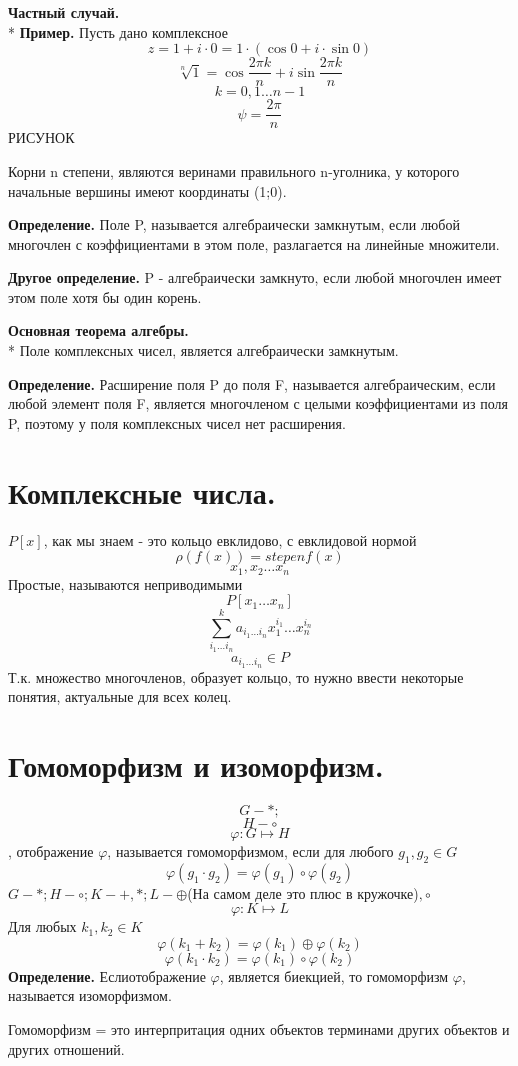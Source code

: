 \documentclass{article}
\begin{document}
{\bf Частный случай.}\\*
{\bf Пример.} Пусть дано комплексное $$z=1+i\cdot 0=1\cdot(\cos0+i\cdot\sin0)$$
$$\sqrt[n]{1}=\cos\frac{2\pi k}{n}+i\sin\frac{2\pi k}{n}$$
$$k=0,1\ldots n-1$$
$$\psi=\frac{2\pi}{n}$$
РИСУНОК

Корни n степени, являются веринами правильного n-уголника, у которого начальные вершины имеют координаты (1;0).

{\bf Определение.} Поле P, называется алгебраически замкнутым, если любой многочлен с коэффициентами в этом поле, разлагается на линейные множители.

{\bf Другое определение.} P - алгебраически замкнуто, если любой многочлен имеет  этом поле хотя бы один корень.

{\bf Основная теорема алгебры.}\\*
Поле комплексных чисел, является алгебраически замкнутым.

{\bf Определение.} Расширение поля P до поля F, называется алгебраическим, если любой элемент поля F, является многочленом с целыми коэффициентами из поля P, поэтому у поля комплексных чисел нет расширения.
\section*{Комплексные числа.} 
$P[x]$, как мы знаем - это кольцо евклидово, с евклидовой нормой $$\rho(f(x))=stepenf(x)$$
$$x_1,x_2\ldots x_n$$
Простые, называются неприводимыми $$P[x_1\ldots x_n]$$
$$\sum_{i_1\ldots i_n}^k a_{i_1\ldots i_n}x^{i_1}_1\ldots x^{i_n}_n$$
$$a_{i_1\ldots i_n}\in P$$
Т.к. множество многочленов, образует кольцо, то нужно ввести некоторые понятия, актуальные для всех колец.

\section*{Гомоморфизм и изоморфизм.} $$G - *;$$ $$H - \circ$$
$$\varphi:G\mapsto H$$, отображение $\varphi$, называется гомоморфизмом, если для любого $g_1,g_2\in G$ $$\varphi(g_1\cdot g_2)=\varphi(g_1)\circ\varphi(g_2)$$
$G - *; H - \circ; K - +,*; L - \oplus$(На самом деле это плюс в кружочке)$,\circ$ 
$$\varphi:K\mapsto L$$
Для любых $k_1,k_2\in K$
$$\varphi(k_1+k_2)=\varphi(k_1)\oplus\varphi(k_2)$$
$$\varphi(k_1\cdot k_2)=\varphi(k_1)\circ\varphi(k_2)$$
{\bf Определение.} Еслиотображение $\varphi$, является биекцией, то гомоморфизм $\varphi$, называется изоморфизмом.

Гомоморфизм = это интерпритация одних объектов терминами других объектов и других отношений.
\end{document}
